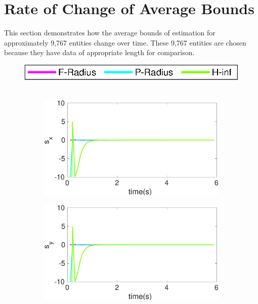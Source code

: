 \FloatBarrier
\section{Rate of Change of Average Bounds}\label{eresult:rate}
This section demonstrates how the average bounds of estimation for approximately 9,767 entities change over time. These 9,767 entities are chosen because they have data of appropriate length for comparison.
\begin{figure}[!h]
\hspace*{\fill} \includegraphics[scale=0.8]{figures/ratelegend}\\\\
\begin{subfigure}{.5\linewidth}
\centering
\includegraphics[width=\linewidth]{figures/BoundChange/CV/cv_bound_changes_x}
\end{subfigure}
\begin{subfigure}{.5\linewidth}
\centering
\includegraphics[width=\linewidth]{figures/BoundChange/CV/cv_bound_changes_y}

\end{subfigure}
\end{figure}

